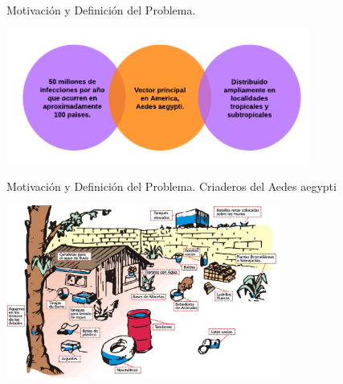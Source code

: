 \begin{frame}[t]{Motivación y Definición del Problema.}
  \begin{center}
    \includegraphics[width=10cm]{./graphics/dengue-intro.png}
  \end{center}
\end{frame}


\begin{frame}[t]{Motivación y Definición del Problema.  Criaderos del Aedes aegypti}
\begin{center}
    \includegraphics[width=9cm]{./graphics/criaderos.jpg}
    \end{center}
\end{frame}





